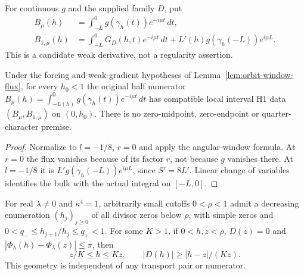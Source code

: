 \begin{definition}
\label{def:half-numerator-derivative}
\leanok
For continuous $g$ and the supplied family $D$, put
\[
 \begin{aligned}
 B_\mu(h)&=\int_{-L}^{0}g(\gamma_h(t))e^{-i\mu t}\,dt,\\
 B_{1,\mu}(h)&=\int_{-L}^{0}G_D(h,t)e^{-i\mu t}\,dt+
             L'(h)g(\gamma_h(-L))e^{i\mu L}.
 \end{aligned}
\]
This is a candidate weak derivative, not a regularity assertion.
\end{definition}

\begin{lemma}
\label{lem:half-numerator-moving-endpoints}
\leanok
Under the forcing and weak-gradient hypotheses of
Lemma~\ref{lem:orbit-window-flux}, for every
$h_0<1$ the original half numerator
$B_\mu(h)=\int_{-L(h)}^0g(\gamma_h(t))e^{-i\mu t}\,dt$
has compatible local interval H1 data $(B_\mu,B_{1,\mu})$ on $(0,h_0)$.
There is no zero-midpoint, zero-endpoint or quarter-character premise.
\end{lemma}

\begin{proof}
\leanok
Normalize to $l=-1/8$, $r=0$ and apply the angular-window formula.
At $r=0$ the flux vanishes because of its factor $r$, not because $g$
vanishes there. At $l=-1/8$ it is $L'g(\gamma_h(-L))e^{i\mu L}$,
since $S'=8L'$. Linear change of variables identifies the bulk with
the actual integral on $[-L,0]$.
\end{proof}

\begin{lemma}
\label{lem:quarter-divisor-geometry}
\leanok
For real $\lambda\ne0$ and $\kappa^4=1$, arbitrarily small cutoffs
$0<\rho<1$ admit a decreasing enumeration $(h_j)_{j\ge0}$ of all divisor
zeros below $\rho$, with simple zeros and
$0<q_-\le h_{j+1}/h_j\le q_+<1$.
For some $K>1$, if $0<h,z<\rho$, $D(z)=0$ and
$|\Phi_\lambda(h)-\Phi_\lambda(z)|\le\pi$, then
\[
 z/K\le h\le Kz,\qquad |D(h)|\ge |h-z|/(Kz).
\]
This geometry is independent of any transport pair or numerator.
\end{lemma}

